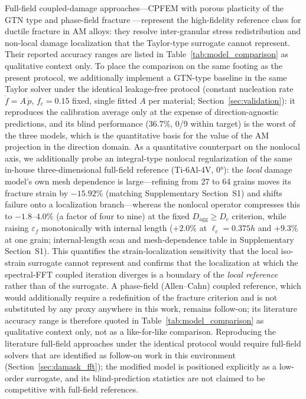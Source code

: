 Full-field coupled-damage approaches---CPFEM with porous plasticity of the GTN type \cite{zhang2021modeling} and phase-field fracture \cite{liu2022phase}---represent the high-fidelity reference class for ductile fracture in AM alloys: they resolve inter-granular stress redistribution and non-local damage localization \cite{andrade2014nonlocal,satouri2022gradient} that the Taylor-type surrogate cannot represent. Their reported accuracy ranges are listed in Table~\ref{tab:model_comparison} as qualitative context only. To place the comparison on the same footing as the present protocol, we additionally implement a GTN-type baseline in the same Taylor solver under the identical leakage-free protocol (constant nucleation rate $\dot f = A\,\dot p$, $f_c = 0.15$ fixed, single fitted $A$ per material; Section~\ref{sec:validation}): it reproduces the calibration average only at the expense of direction-agnostic predictions, and its blind performance (36.7\%, 0/9 within target) is the worst of the three models, which is the quantitative basis for the value of the AM projection in the direction domain. As a quantitative counterpart on the nonlocal axis, we additionally probe an integral-type nonlocal regularization of the same in-house three-dimensional full-field reference (Ti-6Al-4V, $\ang{0}$): the \emph{local} damage model's own mesh dependence is large---refining from 27 to 64 grains moves its fracture strain by $-15.92\%$ (matching Supplementary Section~S1) and shifts failure onto a localization branch---whereas the nonlocal operator compresses this to $-1.8$--$4.0\%$ (a factor of four to nine) at the fixed $D_{\mathrm{agg}} \ge D_c$ criterion, while raising $\varepsilon_f$ monotonically with internal length ($+2.0\%$ at $\ell_c = 0.375h$ and $+9.3\%$ at one grain; internal-length scan and mesh-dependence table in Supplementary Section~S1). This quantifies the strain-localization sensitivity that the local iso-strain surrogate cannot represent and confirms that the localization at which the spectral-FFT coupled iteration diverges is a boundary of the \emph{local reference} rather than of the surrogate. A phase-field (Allen--Cahn) coupled reference, which would additionally require a redefinition of the fracture criterion and is not substituted by any proxy anywhere in this work, remains follow-on; its literature accuracy range is therefore quoted in Table~\ref{tab:model_comparison} as qualitative context only, not as a like-for-like comparison. Reproducing the literature full-field approaches under the identical protocol would require full-field solvers that are identified as follow-on work in this environment (Section~\ref{sec:damask_fft}); the modified model is positioned explicitly as a low-order surrogate, and its blind-prediction statistics are not claimed to be competitive with full-field references.

